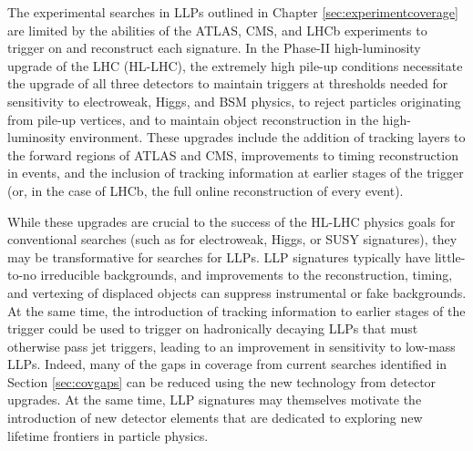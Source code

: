 


\noindent The experimental searches in LLPs outlined in Chapter \ref{sec:experimentcoverage} are limited by the abilities of the ATLAS, CMS, and LHCb experiments to trigger on and reconstruct each signature. In the Phase-II high-luminosity upgrade of the LHC (HL-LHC), the extremely high pile-up conditions necessitate the upgrade of all three detectors to maintain triggers at thresholds needed for sensitivity to electroweak, Higgs, and BSM physics, to reject particles originating from pile-up vertices, and to maintain object reconstruction in the high-luminosity environment. These upgrades include the addition of tracking layers to the forward regions of ATLAS and CMS, improvements to timing reconstruction in events, and the inclusion of tracking information at earlier stages of the trigger (or, in the case of LHCb, the full online reconstruction of every event). 

While these upgrades are crucial to the success of the HL-LHC physics goals for conventional searches (such as for electroweak, Higgs, or SUSY signatures), they may be transformative for searches for LLPs.  LLP signatures typically have little-to-no irreducible backgrounds, and improvements to the reconstruction, timing, and vertexing of displaced objects can suppress instrumental or fake backgrounds. At the same time, the introduction of tracking information to earlier stages of the trigger could be used to trigger on  hadronically decaying LLPs that must otherwise  pass  jet triggers, leading to an improvement in sensitivity to low-mass LLPs. Indeed, many of the gaps in coverage from current searches identified in Section \ref{sec:covgaps} can be reduced using the new technology from detector upgrades. At the same time, LLP signatures  may themselves motivate the introduction of new detector elements that are dedicated to exploring new lifetime frontiers in particle physics.

